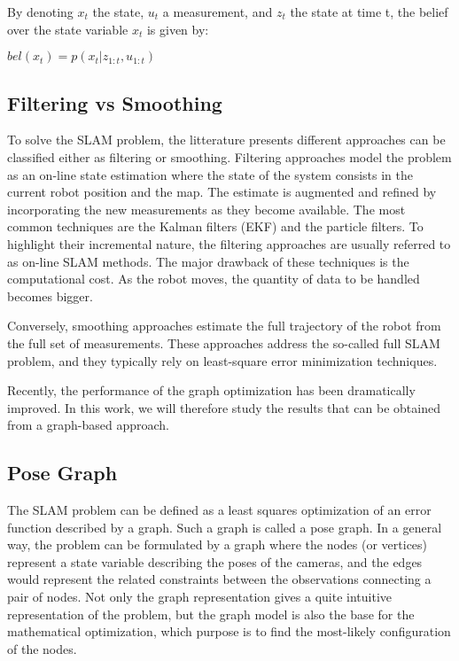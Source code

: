 By denoting $x_t$ the state, $u_t$ a measurement, and $z_t$ the state at time t, the belief over the state variable $x_t$ is given by:

$bel(x_t) = p(x_t | z_{1:t}, u_{1:t})$

\subsection{Filtering vs Smoothing}

To solve the SLAM problem, the litterature presents different approaches can be classified either as filtering or smoothing. Filtering approaches model the problem as an on-line state estimation where the state of the system consists in the current robot position and the map. The estimate is augmented and refined by incorporating the new measurements as they become available.
The most common techniques are the Kalman filters (EKF) and the particle filters. To highlight their incremental nature, the filtering approaches are usually referred to as on-line SLAM methods.
The major drawback of these techniques is the computational cost. As the robot moves, the quantity of data to be handled becomes bigger.

Conversely, smoothing approaches estimate the full trajectory of the robot from the full set of measurements. These approaches address the so-called full SLAM problem, and they typically rely on least-square error minimization techniques.

Recently, the performance of the graph optimization has been dramatically improved. In this work, we will therefore study the results that can be obtained from a graph-based approach.

\subsection{Pose Graph}

The SLAM problem can be defined as a least squares optimization of an error function described by a graph. Such a graph is called a pose graph. In a general way, the problem can be formulated by a graph where the nodes (or vertices) represent a state variable describing the poses of the cameras, and the edges would represent the related constraints between the observations connecting a pair of nodes. Not only the graph representation gives a quite intuitive representation of the problem, but the graph model is also the base for the mathematical optimization, which purpose is to find the most-likely configuration of the nodes.

